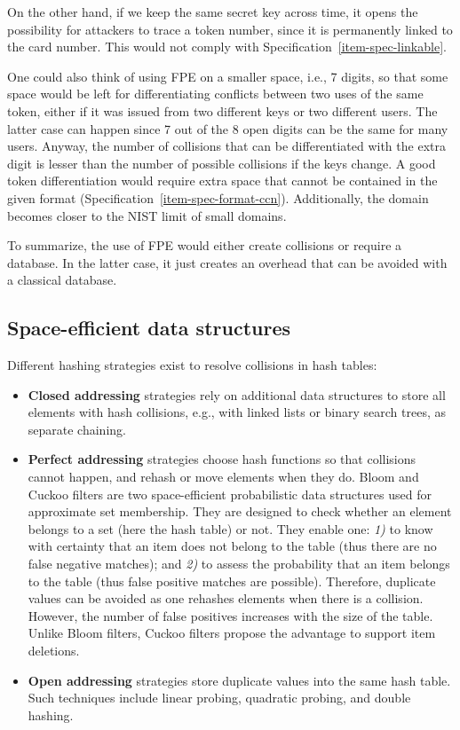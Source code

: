 \documentclass{llncs}
\newcounter{prob}
\begin{document}
On the other hand, if we keep the same secret key across time, it opens the possibility for attackers to trace a token number, since it is permanently linked to the card number. This would not comply with Specification~\ref{item-spec-linkable}.

One could also think of using FPE on a smaller space, i.e., 7 digits, so that some space would be left for differentiating conflicts between two uses of the same token, either if it was issued from two different keys or two different users. The latter case can happen since 7 out of the 8 open digits can be the same for many users. Anyway, the number of collisions that can be differentiated with the extra digit is lesser than the number of possible collisions if the keys change. A good token differentiation would require extra space that cannot be contained in the given format (Specification~\ref{item-spec-format-ccn}). Additionally, the domain becomes closer to the NIST limit of small domains.

To summarize, the use of FPE would either create collisions or require a database. In the latter case, it just creates an overhead that can be avoided with a classical database.

\subsection{Space-efficient data structures}

Different hashing strategies exist to resolve collisions in hash tables:
\begin{itemize}
    \item \textbf{Closed addressing} strategies rely on additional data structures to store all elements with hash collisions, e.g., with linked lists or binary search trees, as separate chaining.
    \item \textbf{Perfect addressing} strategies choose hash functions so that collisions cannot happen, and rehash or move elements when they do. Bloom and Cuckoo filters \cite{Bloom1970} are two space-efficient probabilistic data structures used for approximate set membership. They are designed to check whether an element belongs to a set (here the hash table) or not. They enable one: \textit{1)} to know with certainty that an item does not belong to the table (thus there are no false negative matches); and \textit{2)} to assess the probability that an item belongs to the table (thus false positive matches are possible). Therefore, duplicate values can be avoided as one rehashes elements when there is a collision. However, the number of false positives increases with the size of the table. Unlike Bloom filters, Cuckoo filters propose the advantage to support item deletions.
    \item \textbf{Open addressing} strategies store duplicate values into the same hash table. Such techniques include linear probing, quadratic probing, and double hashing.
\end{itemize}
\end{document}
